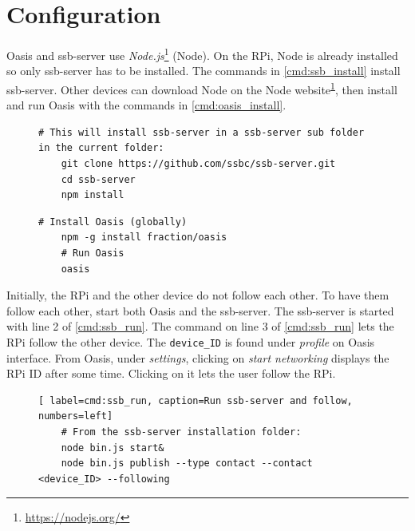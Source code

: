 \documentclass[a4paper,11pt,oneside]{report}
\begin{document}
\section{Configuration}

Oasis and ssb-server use \emph{Node.js}\footnote{\label{foot:node}\url{https://nodejs.org/}} (Node). On the RPi, Node is already installed so only ssb-server has to be installed. The commands in \autoref{cmd:ssb_install} install ssb-server. Other devices can download Node on the Node website\textsuperscript{\ref{foot:node}}, then install and run Oasis with the commands in \autoref{cmd:oasis_install}.

\begin{figure}
\begin{lstlisting}[label=cmd:ssb_install, caption=Install and run ssb-server on the RPi]
    # This will install ssb-server in a ssb-server sub folder in the current folder:
    git clone https://github.com/ssbc/ssb-server.git
    cd ssb-server
    npm install
\end{lstlisting}
\end{figure}

\begin{figure}
\begin{lstlisting}[label=cmd:oasis_install, caption=Install and run Oasis on a device with Node.js]
    # Install Oasis (globally)
    npm -g install fraction/oasis
    # Run Oasis
    oasis
\end{lstlisting}
\end{figure}

Initially, the RPi and the other device do not follow each other. To have them follow each other, start both Oasis and the ssb-server. The ssb-server is started with line 2 of \autoref{cmd:ssb_run}. The command on line 3 of \autoref{cmd:ssb_run} lets the RPi follow the other device. The \verb|device_ID| is found under \emph{profile} on Oasis interface. From Oasis, under \emph{settings}, clicking on \emph{start networking} displays the RPi ID after some time. Clicking on it lets the user follow the RPi.

\begin{figure}
\begin{lstlisting}[ label=cmd:ssb_run, caption=Run ssb-server and follow, numbers=left]
    # From the ssb-server installation folder:
    node bin.js start&
    node bin.js publish --type contact --contact <device_ID> --following
\end{lstlisting}
\end{figure}
\end{document}
